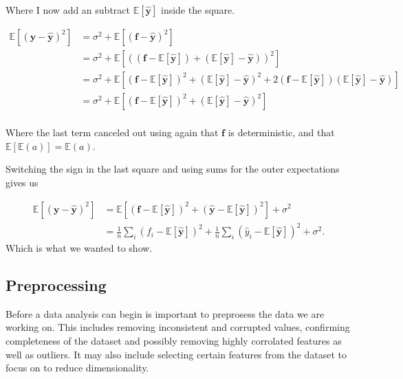 \documentclass[11pt]{article}
\begin{document}
    Where I now add an subtract \(\mathbb{E}[\boldsymbol{\hat{y}}]\) inside
the square.

    \[
\begin{aligned}
\mathbb{E}\left[(\boldsymbol{y}-\boldsymbol{\hat{y}})^2\right] &= \sigma^2 + \mathbb{E}[(\boldsymbol{f}-\boldsymbol{\hat{y}})^2] \\
&= \sigma^2 + \mathbb{E}\left[((\boldsymbol{f}-\mathbb{E}[\boldsymbol{\hat{y}}])+(\mathbb{E}[\boldsymbol{\hat{y}}]-\boldsymbol{\hat{y}}))^2\right]\\
&= \sigma^2 + \mathbb{E}\left[(\boldsymbol{f}-\mathbb{E}[\boldsymbol{\hat{y}}])^2+(\mathbb{E}[\boldsymbol{\hat{y}}]-\boldsymbol{\hat{y}})^2 + 2(\boldsymbol{f}-\mathbb{E}[\boldsymbol{\hat{y}}])(\mathbb{E}[\boldsymbol{\hat{y}}]-\boldsymbol{\hat{y}})\right]\\
&= \sigma^2 + \mathbb{E}\left[(\boldsymbol{f}-\mathbb{E}[\boldsymbol{\hat{y}}])^2+(\mathbb{E}[\boldsymbol{\hat{y}}]-\boldsymbol{\hat{y}})^2 \right]\\
\end{aligned}
\]

    Where the last term canceled out using again that \(\boldsymbol{f}\) is
deterministic, and that \(\mathbb{E}[\mathbb{E}(a)]=\mathbb{E}(a)\).

Switching the sign in the last square and using sums for the outer
expectations gives us

\[
\begin{aligned}
\mathbb{E}\left[(\boldsymbol{y}-\boldsymbol{\hat{y}})^2\right] &= \mathbb{E}\left[(\boldsymbol{f}-\mathbb{E}[\boldsymbol{\hat{y}}])^2+(\boldsymbol{\hat{y}}-\mathbb{E}[\boldsymbol{\hat{y}}])^2 \right] + \sigma^2\\
&= \frac{1}{n}\sum_i(f_i-\mathbb{E}\left[\boldsymbol{\hat{y}}\right])^2+\frac{1}{n}\sum_i(\hat{y}_i-\mathbb{E}\left[\boldsymbol{\hat{y}}\right])^2+\sigma^2.
\end{aligned}
\] Which is what we wanted to show.

    \hypertarget{preprocessing}{%
\subsection{Preprocessing}\label{preprocessing}}

Before a data analysis can begin is important to preprosess the data we
are working on. This includes removing inconsistent and corrupted
values, confirming completeness of the dataset and possibly removing
highly corrolated features as well as outliers. It may also include
selecting certain features from the dataset to focus on to reduce
dimensionality.
\end{document}
